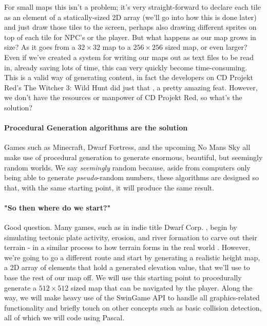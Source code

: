 \documentclass{article}
\begin{document}
For small maps this isn't a problem; it's very straight-forward to declare each tile as an element of a statically-sized 2D array (we'll go into how this is done later) and just draw those tiles 	to the screen, perhaps also drawing different sprites on top of each tile for NPC's or the player. But what happens as our map grows in size? As it goes from a $32 \times 32$ map to a $256 \times 256$ sized map, or even larger? Even if we've created a system for writing our maps out as text files to be read in, already saving lots of time, this can very quickly become time-consuming. This is a valid way of generating content, in fact the developers on CD Projekt Red's The Witcher 3: Wild Hunt did just that \parencite{witcher}, a pretty amazing feat. However, we don't have the resources or manpower of CD Projekt Red, so what's the solution?
		
\paragraph{Procedural Generation algorithms are the solution}\mbox{}
		
Games such as Minecraft, Dwarf Fortress, and the upcoming No Mans Sky all make use of procedural generation to generate enormous, beautiful, but seemingly random worlds. We say \emph{seemingly} random because, aside from computers only being able to generate \emph{pseudo}-random numbers, these algorithms are designed so that, with the same starting point, it will produce the same result.
		
\paragraph{"So then where do we start?"}
		
Good question. Many games, such as in indie title Dwarf Corp. \parencite{dwarfcorp}, begin by simulating tectonic plate activity, erosion, and river formation to carve out their terrain -  in a similar process to how terrain forms in the real world \parencite[pp. 46]{huggett}. However, we're going to go a different route and start by generating a realistic height map, a 2D array of elements that hold a generated elevation value, that we'll use to base the rest of our map off. We will use this starting point to procedurally generate a $512 \times 512$ sized map that can be navigated by the player. Along the way, we will make heavy use of the SwinGame API to handle all graphics-related functionality and briefly touch on other concepts such as basic collision detection, all of which we will code using Pascal.
	
\end{document}
